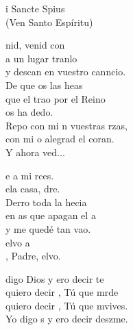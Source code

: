 \documentclass[12pt]{article}
\begin{document}
\begin{multicols*}{2}
\begin{cancion}%
	i Sancte Spius\\
(Ven Santo Espíritu)\\
\end{cancion}%

\begin{cancion}%
	nid, venid con \\
	a un lugar tranlo\\
	y descan en  vuestro canncio. \\
	De que os  las heas\\
	que el trao por el Reino \\
	os ha dedo.\\
	Repo con mi n vuestras rzas,\\
	con mi o alegrad el coran. \\
\jump
	Y ahora ved...\\
\end{cancion}%

\begin{cancion}[Vuelvo][Ixcís]%
	e a mi rces. \\
	ela casa, dre.\\
	Derro toda la hecia \\
	en as que apagan el a\\
	y me quedé tan vao. \\
	elvo a \\
	, Padre, elvo.\\
\end{cancion}%

\begin{cancion}%
	 digo Dios y ero decir te  \\
	quiero decir , Tú que mrde\\
	quiero decir , Tú que mvives.\\
	Yo digo s y ero decir deszme.\\
\jump
	  \\
\end{cancion}%

\end{multicols*}
\end{document}
